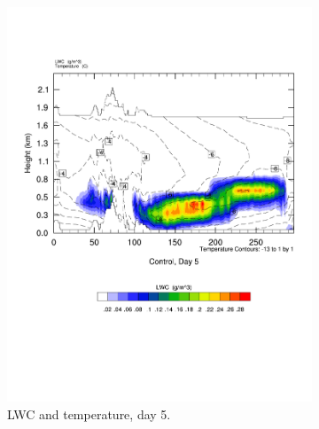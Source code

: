 \begin{figure}
    \begin{subfigure}{0.48\textwidth}
        \centering
        \includegraphics[width=\textwidth]{results/control/crossSec_LWC_Control_Day5.pdf}
        \caption{LWC and temperature, day 5.}
        \label{subfig:cross_LWC_Day5}
    \end{subfigure}
    \begin{subfigure}{0.48\textwidth}
        \centering

\end{subfigure}
\end{figure}
